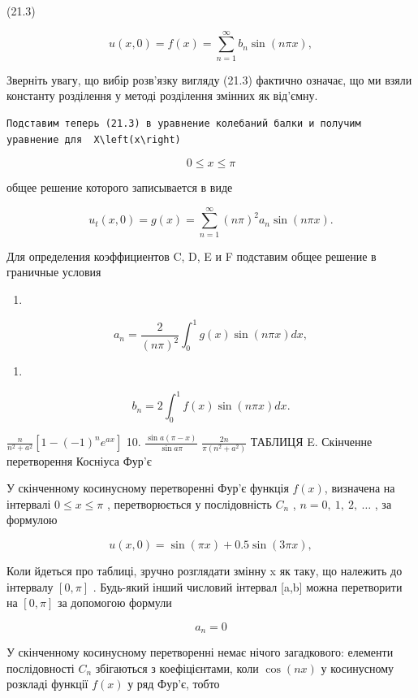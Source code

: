 \documentclass[
  ukrainian,
]{article}
\providecommand{\tightlist}{%
  \setlength{\itemsep}{0pt}\setlength{\parskip}{0pt}}
\begin{document}
(21.3)

\[
u(x, 0) = f(x) = \sum_{n=1}^{\infty} b_n \sin(n\pi x),
\]

Зверніть увагу, що вибір розв'язку вигляду (21.3) фактично означає, що
ми взяли константу розділення у методі розділення змінних як від'ємну.

\begin{verbatim}
Подставим теперь (21.3) в уравнение колебаний балки и получим уравнение для  X\left(x\right)
\end{verbatim}

\[
0 \le x \le \pi
\]

общее решение которого записывается в виде

\[
u_t(x, 0) = g(x) = \sum_{n=1}^{\infty} (n\pi)^2 a_n \sin(n\pi x).
\]

Для определения коэффициентов C, D, E и F подставим общее решение в
граничные условия

\begin{enumerate}
\def\labelenumi{\arabic{enumi}.}
\tightlist
\item
\end{enumerate}

\[
a_n = \frac{2}{(n\pi)^2} \int_0^1 g(x) \sin(n\pi x) dx,
\]

\begin{enumerate}
\def\labelenumi{\arabic{enumi}.}
\setcounter{enumi}{8}
\tightlist
\item
\end{enumerate}

\[
b_n = 2 \int_0^1 f(x) \sin(n\pi x) dx.
\]

\(\frac{n}{n^2 + a^2} [1 - (-1)^n e^{ax}]\) 10.
\(\frac{\sin a (\pi - x)}{\sin a\pi}\) \(\frac{2n}{\pi (n^2 + a^2)}\)
ТАБЛИЦЯ E. Скінченне перетворення Косніуса Фур'є

У скінченному косинусному перетворенні Фур'є функція \(f(x)\), визначена
на інтервалі \(0 \le x \le \pi\) , перетворюється у послідовність
\(C_n\) , \(n=0,\ 1,\ 2,\ \ldots\) , за формулою

\[
u(x, 0) = \sin(\pi x) + 0.5 \sin(3\pi x),
\]

Коли йдеться про таблиці, зручно розглядати змінну x як таку, що
належить до інтервалу \([0,\pi]\) . Будь-який інший числовий інтервал
{[}a,b{]} можна перетворити на \([0,\pi]\) за допомогою формули

\[
a_n=0
\]

У скінченному косинусному перетворенні немає нічого загадкового:
елементи послідовності \(C_n\) збігаються з коефіцієнтами, коли
\(\cos{(nx)}\) у косинусному розкладі функції \(f(x)\) у ряд Фур'є,
тобто
\end{document}
